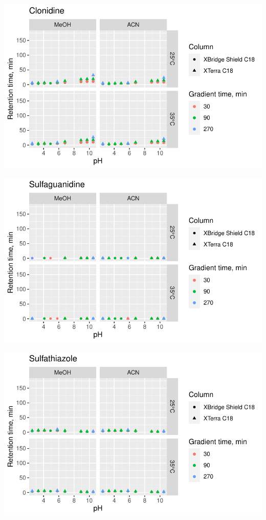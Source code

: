 \documentclass[
  letterpaper,
  DIV=11,
  numbers=noendperiod]{scrreprt}
\begin{document}
\includegraphics{index_files/figure-pdf/unnamed-chunk-4-39.pdf}

\includegraphics{index_files/figure-pdf/unnamed-chunk-4-40.pdf}

\includegraphics{index_files/figure-pdf/unnamed-chunk-4-41.pdf}
\end{document}
